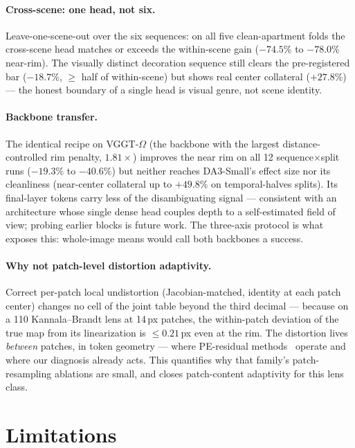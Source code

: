 \documentclass{article}
\begin{document}
\paragraph{Cross-scene: one head, not six.} Leave-one-scene-out over the six
sequences: on all five clean-apartment folds the cross-scene head matches or
exceeds the within-scene gain ($-74.5\%$ to $-78.0\%$ near-rim). The
visually distinct decoration sequence still clears the pre-registered bar
($-18.7\%$, $\ge$ half of within-scene) but shows real center collateral
($+27.8\%$) --- the honest boundary of a single head is visual genre, not
scene identity.

\paragraph{Backbone transfer.} The identical recipe on VGGT-$\Omega$ (the
backbone with the largest distance-controlled rim penalty, $1.81\times$)
improves the near rim on all 12 sequence$\times$split runs ($-19.3\%$ to
$-40.6\%$) but neither reaches DA3-Small's effect size nor its cleanliness
(near-center collateral up to $+49.8\%$ on temporal-halves splits). Its
final-layer tokens carry less of the disambiguating signal --- consistent with
an architecture whose single dense head couples depth to a self-estimated
field of view; probing earlier blocks is future work. The three-axis
protocol is what exposes this: whole-image means would call both backbones a
success.

\paragraph{Why not patch-level distortion adaptivity.} Correct per-patch
local undistortion (Jacobian-matched, identity at each patch center) changes
no cell of the joint table beyond the third decimal --- because on a
110\textdegree{} Kannala--Brandt lens at 14\,px patches, the within-patch
deviation of the true map from its linearization is $\le0.21$\,px even at
the rim. The distortion lives \emph{between} patches, in token geometry ---
where PE-residual methods~\cite{raytun3r} operate and where our diagnosis
already acts. This quantifies why that family's patch-resampling ablations
are small, and closes patch-content adaptivity for this lens class.

\section{Limitations}
\label{sec:limitations}
\end{document}
